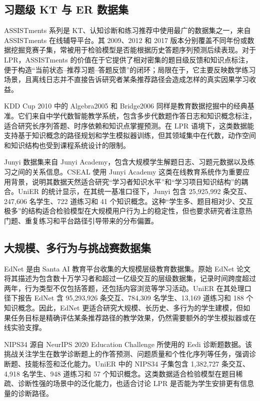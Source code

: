 \documentclass[UTF8,a4paper,zihao=-4]{ctexart}
\begin{document}
\subsection{习题级 KT 与 ER 数据集}

ASSISTments 系列是 KT、认知诊断和练习推荐中使用最广的数据集之一，来自 ASSISTments 在线辅导平台。其 2009、2012 和 2017 版本分别覆盖不同年份或数据挖掘竞赛子集，常被用于检验模型是否能根据历史答题序列预测后续表现\cite{ASSISTmentsData2009,Cheng2026UniER}。对于 LPR，ASSISTments 的价值在于它提供了相对密集的题目级反馈和知识点标注，便于构造“当前状态--推荐习题--答题反馈”的闭环；局限在于，它主要反映数学练习场景，且离线日志并不直接告诉研究者某条推荐路径会造成怎样的真实因果学习收益。

KDD Cup 2010 中的 Algebra2005 和 Bridge2006 同样是教育数据挖掘中的经典基准。它们来自中学代数智能教学系统，包含多步代数题作答日志和知识概念标注，适合研究长序列答题、时序依赖和知识点掌握预测\cite{Cheng2026UniER}。在 LPR 语境下，这类数据能支持基于知识概念的路径规划和学生模拟器训练，但其领域集中在代数，动作空间和知识结构也受到课程系统设计的限制。

Junyi 数据集来自 Junyi Academy，包含大规模学生解题日志、习题元数据以及练习之间的关系信息。CSEAL 使用 Junyi Academy 这类在线教育系统作为重要应用背景，说明其数据天然适合研究“学习者知识水平”和“学习项目知识结构”的耦合\cite{Liu2019CSEAL}。UniER 的统计显示，在其统一基准口径下，Junyi 包含 25,925,992 条交互、247,606 名学生、722 道练习和 41 个知识概念\cite{Cheng2026UniER}。这种“学生多、题目相对少、交互极多”的结构适合检验模型在大规模用户行为上的稳定性，但也要求研究者注意热门题、重复练习和平台路径引导带来的分布偏置。

\subsection{大规模、多行为与挑战赛数据集}

EdNet 是由 Santa AI 教育平台收集的大规模层级教育数据集。原始 EdNet 论文将其描述为包含数十万学习者和超过一亿级交互的层级数据集，记录时间跨度超过两年，行为类型不仅包括答题，还包括内容浏览等学习活动\cite{Choi2020EdNet}。UniER 在其处理口径下报告 EdNet 含 95,293,926 条交互、784,309 名学生、13,169 道练习和 188 个知识概念\cite{Cheng2026UniER}。因此，EdNet 更适合研究大规模、长历史、多行为的学生建模，但如果任务目标是精确评估某条推荐路径的教学效果，仍然需要额外的学生模拟器或在线实验支撑。

NIPS34 源自 NeurIPS 2020 Education Challenge 所使用的 Eedi 诊断题数据。该挑战关注学生在数学诊断题上的作答预测、问题质量和个性化序列等任务，强调诊断题、技能标签和泛化能力\cite{Wang2020NeurIPSEducation}。UniER 中的 NIPS34 子集包含 1,382,727 条交互、4,918 名学生、948 道练习和 57 个知识概念\cite{Cheng2026UniER}。这类数据适合检验模型在题目稀疏、诊断性强的场景中的泛化能力，也适合讨论 LPR 是否能为学生安排更有信息量的诊断路径。
\end{document}
